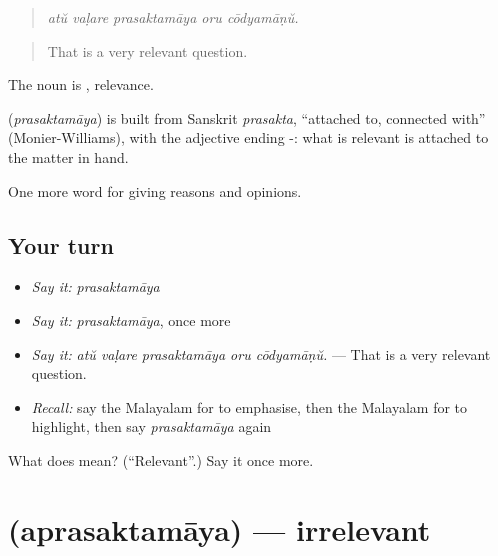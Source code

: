 \begin{quote}
\emph{atŭ vaḷare prasaktamāya oru cōdyamāṇŭ.}
\end{quote}

\begin{quote}
That is a very relevant question.
\end{quote}

The noun is , relevance.

\begin{cousinweb}
\textbf{} (\emph{prasaktamāya}) is built from Sanskrit \emph{prasakta}, \textquotedblleft{}attached to, connected with\textquotedblright{} (Monier-Williams), with the adjective ending -: what is relevant is attached to the matter in hand.
\end{cousinweb}

\begin{grammarlens}[title={What you've built}]
One more word for giving reasons and opinions.
\end{grammarlens}

\subsection*{Your turn}
\begin{itemize}
\raggedright
  \item \emph{Say it:} \emph{prasaktamāya}
  \item \emph{Say it:} \emph{prasaktamāya}, once more
  \item \emph{Say it:} \emph{atŭ vaḷare prasaktamāya oru cōdyamāṇŭ.} — That is a very relevant question.
  \item \emph{Recall:} say the Malayalam for to emphasise, then the Malayalam for to highlight, then say \emph{prasaktamāya} again
\end{itemize}

\begin{tcolorbox}[breakable,colback=teal!4,colframe=teal!35!black,title={Before you move on}]
What does  mean? (\textquotedblleft{}Relevant\textquotedblright{}.) Say it once more.
\end{tcolorbox}
\section[\texorpdfstring{\ml{അപ്രസക്തമായ} (aprasaktamāya)}{അപ്രസക്തമായ (aprasaktamāya)}]{ (aprasaktamāya) — irrelevant}

\label{lesson:ML-C410-aprasaktamaya}




